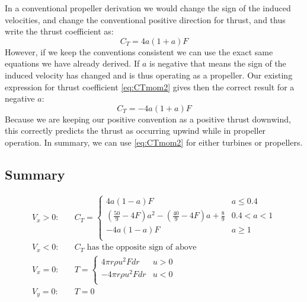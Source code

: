 \documentclass{article}
\begin{document}
In a conventional propeller derivation we would change the sign of the induced velocities, and change the conventional positive direction for thrust, and thus write the thrust coefficient as:
\begin{equation}
    C_T = 4 a (1 + a) F
\end{equation}
However, if we keep the conventions consistent we can use the exact same equations we have already derived.  If $a$ is negative that means the sign of the induced velocity has changed and is thus operating as a propeller.  Our existing expression for thrust coefficient \cref{eq:CTmom2} gives then the correct result for a negative $a$:
\begin{equation}
    C_T = - 4 a (1 + a) F
\end{equation}
Because we are keeping our positive convention as a positive thrust downwind, this correctly predicts the thrust as occurring upwind while in propeller operation.  In summary, we can use \cref{eq:CTmom2} for either turbines or propellers.

\subsection{Summary}
\label{sec:momsum}

\begin{equation}
\begin{aligned}
    V_x > 0:&\quad
    C_T =
    \begin{cases}
        4 a (1 - a) F &  a \le 0.4 \\
        \left(\frac{50}{9} - 4F\right) a^2 - \left(\frac{40}{9} - 4F\right) a + \frac{8}{9} &  0.4 < a < 1 \\
        -4 a (1 - a) F &  a \ge 1 \\
    \end{cases}\\
    V_x < 0:&\quad C_T \text{ has the opposite sign of above}\\
    V_x = 0:&\quad  T =
        \begin{cases}
        4 \pi r \rho u^2 F dr & u > 0\\
        -4 \pi r \rho u^2 F dr & u < 0\\
        \end{cases}\\
    V_y = 0:&\quad T = 0\\
\end{aligned}
\label{eq:CTmom}
\end{equation}
\end{document}

